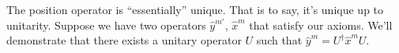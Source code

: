 \begin{comment}
Although $\widehat{p}_{n}$ is unbdefined on $|x^{m}\>$, the
axioms for the position operator imply that the exponential
$\exp(-ia^{m}\widehat{p}_{m})$ must be defined on these states:
\begin{equation}%
e^{-ia^{m}\widehat{p}_{m}}|x^{n}\> = |x^{n}+a^{n}\>.
\end{equation}
Also, if $\<\overline{k}|\overline{x}=\overline{0}\>=1$, then
$\<\overline{k}|\overline{a}\>=\exp(-ia^{m}k_{m})$. 
\end{comment}

\begin{rmk}
The position operator is ``essentially'' unique. That is to say,
it's unique up to unitarity. Suppose we have two operators
$\widehat{y}^{m'}$, $\widehat{x}^{m}$ that satisfy our
axioms. We'll demonstrate that there exists a unitary operator
$U$ such that $\widehat{y}^{m}=U^{\dag}\widehat{x}^{m}U$.


\end{rmk}
